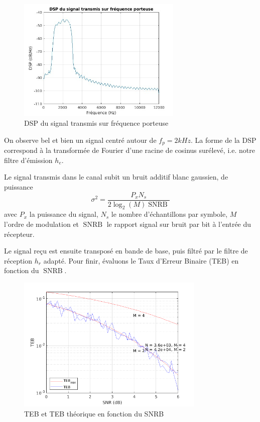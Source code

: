\documentclass[a4paper, 12pt]{article}
\begin{document}
\begin{figure}[H]
    \centering
    \includegraphics[width=0.7\textwidth]{graphics/1-3.jpg}
    \caption{DSP du signal transmis sur fréquence porteuse}
    \label{fig:sig_porteuse_dsp}
\end{figure}

On observe bel et bien un signal centré autour de $f_p = 2kHz$. La forme de la
DSP correspond à la transformée de Fourier d'une racine de cosinus surélevé, i.e.
notre filtre d'émission $h_e$. \medbreak

Le signal transmis dans le canal subit un bruit additif blanc gaussien, de
puissance \[ \sigma^2 = \frac{P_x N_s}{2 \log_2(M) \operatorname{SNRB}} \] avec
$P_x$ la puissance du signal, $N_s$ le nombre d'échantillons par symbole, $M$
l'ordre de modulation et $\operatorname{SNRB}$ le rapport signal sur bruit par
bit à l'entrée du récepteur. \medbreak

Le signal reçu est ensuite transposé en bande de base, puis filtré par le filtre
de réception $h_r$ adapté. Pour finir, évaluons le Taux d'Erreur Binaire (TEB)
en fonction du $\operatorname{SNRB}$. \medbreak

\begin{figure}[H]
    \centering
    \includegraphics[width=0.8\textwidth]{graphics/1-5.png}
    \caption{TEB et TEB théorique en fonction du SNRB}
    \label{fig:teb_snrb_dvbs}
\end{figure}
\end{document}
